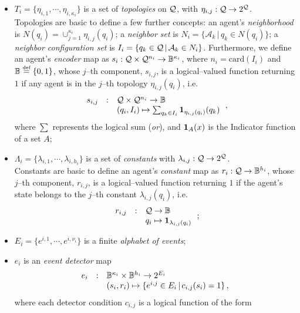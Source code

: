 \documentclass[journal, onecolumn, 12pt]{styles/IEEEtran}
\begin{document}
\begin{definition}
\begin{itemize}
\item $T_i = \{\eta_{i,1}, \cdots, \eta_{i,\kappa_i}\}$ is a set of {\em topologies} on $\mathcal{Q}$, with ${\eta_{i,j} : \mathcal{Q} \rightarrow 2^{\mathcal{Q}}}$. \\ Topologies are basic to define a few further concepts: an agent's {\em neighborhood} is 
  $ N(q_i) = \cup_{j=1}^{\kappa_i} \eta_{i,j}(q_i)$;  a {\em neighbor set} is $N_i = \{\mathcal{A}_k \, | \, q_k \in N(q_i)\}$; a {\em neighbor configuration set} is $I_i = \{ q_k \in \mathcal{Q} \, | \, \mathcal{A}_k \in N_i\}$. Furthermore, we define an
  agent's {\em encoder} map as ${s_i : \mathcal{Q} \times \mathcal{Q}^{n_i} \rightarrow
    \Bbb{B}^{\kappa_i}}$, where $n_i=\mbox{card}(I_i)$ and $\bool
  \mydefeq \{0,1\}$, whose $j$--th component, $s_{i,j}$, is a
  logical--valued function returning $1$ if any agent is in the $j$--th topology $\eta_{i,j}(q_i)$, i.e.
$$
\begin{array}{rcl}
s_{i,j} & : & \mathcal{Q} \times \mathcal{Q}^{n_i} \rightarrow \Bbb{B} \\
& & (q_i, I_i) \mapsto \sum_{q_k \in I_i} {\bf 1}_{\eta_{i,j}(q_i)}(q_k)
\end{array}
\, ,
$$
where $\sum$ represents the logical sum ({\em or}), and ${\bf 1}_A(x)$ is the Indicator function of a set $A$;
\item
$\Lambda_i = \{\lambda_{i,1}, \cdots, \lambda_{i,h_i}\}$ is a set of {\em constants} with ${\lambda_{i,j} : \mathcal{Q} \rightarrow 2^{\mathcal{Q}}}$. \\ Constants are basic to define an agent's {\em constant} map as ${r_i : \mathcal{Q} \rightarrow \Bbb{B}^{h_i}}$, whose $j$--th component, $r_{i,j}$, is a logical--valued function returning $1$ if the agent's state belongs to the $j$--th constant $\lambda_{i,j}(q_i)$, i.e.
$$
\begin{array}{rcl}
r_{i,j} & : & \mathcal{Q} \rightarrow \Bbb{B} \\
& & q_i \mapsto {\bf 1}_{\lambda_{i,j}(q_i)}
\end{array}
\, ;
$$
\item
$E_i=\{e^{i,1}, \cdots, e^{i,\nu_i}\}$ is a finite {\em alphabet of events};
\item $e_i$ is an {\em event detector} map
$$
\begin{array}{rcl}
e_i & : & \Bbb{B}^{\kappa_i} \times \Bbb{B}^{h_i}  \rightarrow 2^{E_i} \\
& & (s_i, r_i) \mapsto \{e^{i,j} \in E_i \, | \, c_{i,j}(s_i) = 1\} \, ,
\end{array}
$$
where each detector condition $c_{i,j}$ is a logical function of the form
\begin{equation}

\end{equation}
\end{itemize}
\end{definition}
\end{document}
